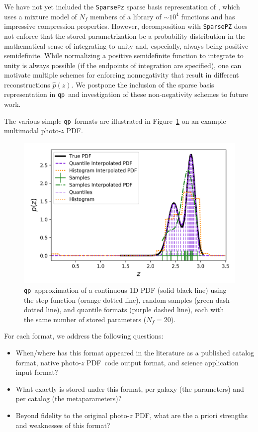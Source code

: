 \documentclass[\docopts]{\docclass}
\newcommand{\qp}{\texttt{qp}\xspace}
\newcommand{\pz}{photo-$z$ PDF\xspace}
\begin{document}
We have not yet included the \texttt{SparsePz} sparse basis representation of
\citet{carrasco_kind_sparse_2014}, which uses a mixture model of $N_{f}$
members of a library of $\sim10^{4}$ functions and has impressive compression
properties.
However, decomposition with \texttt{SparsePZ} does not enforce that the stored parametrization be a probability
distribution in the mathematical sense of integrating to unity and, especially,
always being positive semidefinite.
While normalizing a positive semidefinite
function to integrate to unity is always possible (if the endpoints of
integration are specified), one can motivate multiple schemes for enforcing
nonnegativity that result in different reconstructions $\hat{p}(z)$.
We postpone the inclusion of the sparse basis
representation in \qp\ and investigation of these non-negativity schemes to future work.

The various simple \qp\ formats are illustrated in Figure~\ref{fig:qp} on an example multimodal \pz.
\begin{figure}
  \includegraphics[width=0.9\columnwidth]{figures/demo_pz.png}
  \caption{\qp\ approximation of a continuous 1D PDF (solid black line) using
the step function (orange dotted line), random samples (green dash-dotted line),
and quantile formats (purple dashed line), each with the same number of stored parameters ($N_{f}=20$).
  \label{fig:qp}}
\end{figure}

For each format, we address the following questions:
\begin{itemize}
  \item When/where has this format appeared in the literature as a published
catalog format, native \pz\ code output format, and science application input
format?
  \item What exactly is stored under this format, per galaxy (the parameters)
and per catalog (the metaparameters)?
  \item Beyond fidelity to the original \pz, what are the a priori strengths
and weaknesses of this format?
\end{itemize}
\end{document}
